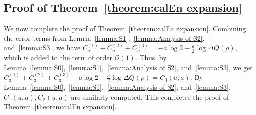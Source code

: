 \documentclass[reqno]{amsart}
\newcommand{\1}{\mathds{1}}
\numberwithin{equation}{section}
\theoremstyle{definition}
\begin{document}
\subsection{Proof of Theorem~\ref{theorem:calEn expansion}}
We now complete the proof of Theorem~\ref{theorem:calEn expansion}. 
Combining the error terms from Lemma~\ref{lemma:S1},~\ref{lemma:Analysis of S2}, and~\ref{lemma:S3}, we have $C_n^{(1)}+C_{n}^{(2)}+C_{n}^{(3)}=
-a\log2-\frac{a}{2}\log\Delta Q(\rho)$, which is added to the term of order $\mathcal{O}(1)$.
Thus, by Lemma~\ref{lemma:S0},~\ref{lemma:S1},~\ref{lemma:Analysis of S2}, and~\ref{lemma:S3}, we get $C_3^{(1)}+C_3^{(2)}+C_3^{(3)}-a\log2-\frac{a}{2}\log\Delta Q(\rho)=C_3(u,a)$.
By Lemma~\ref{lemma:S0},~\ref{lemma:S1},~\ref{lemma:Analysis of S2}, and~\ref{lemma:S3}, $C_1(u,a),C_2(u,a)$ are similarly computed.
This completes the proof of Theorem~\ref{theorem:calEn expansion}. 
\end{document}
